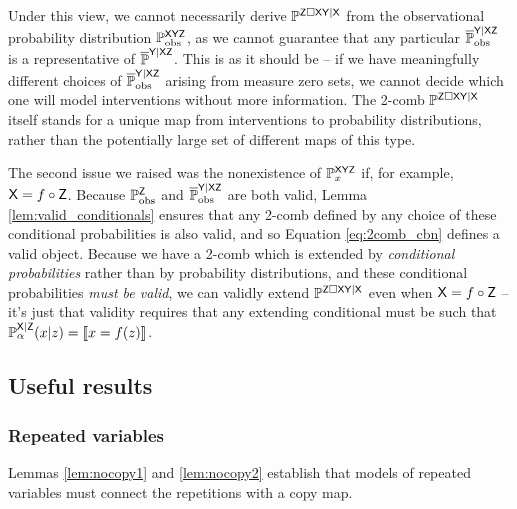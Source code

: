 Under this view, we cannot necessarily derive $\mathbb{P}^{\mathsf{Z}\square\mathsf{XY}|\mathsf{X}}$ from the observational probability distribution $\mathbb{P}_{\text{obs}}^{\mathsf{XYZ}}$, as we cannot guarantee that any particular $\overline{\mathbb{P}}_{\text{obs}}^{\mathsf{Y}|\mathsf{XZ}}$ is a representative of $\overline{\mathbb{P}}^{\mathsf{Y}|\mathsf{XZ}}$. This is as it should be -- if we have meaningfully different choices of $\overline{\mathbb{P}}_{\text{obs}}^{\mathsf{Y}|\mathsf{XZ}}$ arising from measure zero sets, we cannot decide which one will model interventions without more information. The 2-comb $\mathbb{P}^{\mathsf{Z}\square\mathsf{XY}|\mathsf{X}}$ itself stands for a unique map from interventions to probability distributions, rather than the potentially large set of different maps of this type.

The second issue we raised was the nonexistence of $\mathbb{P}^{\mathsf{XYZ}}_{x}$ if, for example, $\mathsf{X}=f\circ \mathsf{Z}$. Because $\mathbb{P}_{\text{obs}}^{\mathsf{Z}}$ and $\overline{\mathbb{P}}_{\text{obs}}^{\mathsf{Y}|\mathsf{XZ}}$ are both valid, Lemma \ref{lem:valid_conditionals} ensures that any 2-comb defined by any choice of these conditional probabilities is also valid, and so Equation \ref{eq:2comb_cbn} defines a valid object. Because we have a 2-comb which is extended by \emph{conditional probabilities} rather than by probability distributions, and these conditional probabilities \emph{must be valid}, we can validly extend $\mathbb{P}^{\mathsf{Z}\square\mathsf{XY}|\mathsf{X}}$ even when $\mathsf{X}=f\circ \mathsf{Z}$ -- it's just that validity requires that any extending conditional must be such that $\mathbb{P}_\alpha^{\mathsf{X}|\mathsf{Z}}(x|z)=\llbracket x=f(z) \rrbracket$.


\subsection{Useful results}

\subsubsection{Repeated variables}

Lemmas \ref{lem:nocopy1} and \ref{lem:nocopy2} establish that models of repeated variables must connect the repetitions with a copy map.

